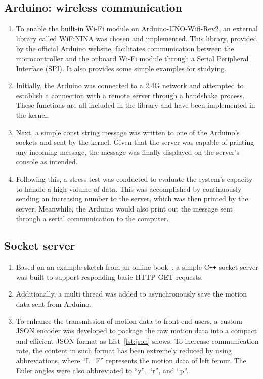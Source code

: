 \subsection{Arduino: wireless communication} \label{subsec:5g-network}
\begin{enumerate}
	\item   To enable the built-in Wi-Fi module on Arduino-UNO-Wifi-Rev2, an external library called WiFiNINA was chosen and implemented.
	This library, provided by the official Arduino website, facilitates communication between the microcontroller and the onboard Wi-Fi module through a Serial Peripheral Interface (SPI).
	It also provides some simple examples for studying.
	\item   Initially, the Arduino was connected to a 2.4G network and attempted to establish a connection with a remote server through a handshake process.
	These functions are all included in the library and have been implemented in the kernel.
	\item   Next, a simple const string message was written to one of the Arduino's sockets and sent by the kernel.
	Given that the server was capable of printing any incoming message, the message was finally displayed on the server's console as intended.
	\item   Following this, a stress test was conducted to evaluate the system's capacity to handle a high volume of data.
	This was accomplished by continuously sending an increasing number to the server, which was then printed by the server.
	Meanwhile, the Arduino would also print out the message sent through a serial communication to the computer.
\end{enumerate}


\subsection{Socket server}
\begin{enumerate}
	\item   Based on an example sketch from an online book~\cite{beej-guide}, a simple C\texttt{++} socket server was built to support responding basic HTTP-GET requests.
	\item   Additionally, a multi thread was added to asynchronously save the motion data sent from Arduino.
	\item   To enhance the transmission of motion data to front-end users, a custom JSON encoder was developed to package the raw motion data into a compact and efficient JSON format as List~\ref{lst:json} shows.
	To increase communication rate, the content in such format has been extremely reduced by using abbreviations, where ``L\_F'' represents the motion data of left femur.
	The Euler angles were also abbreviated to ``y'', ``r'', and ``p''.
\end{enumerate}

